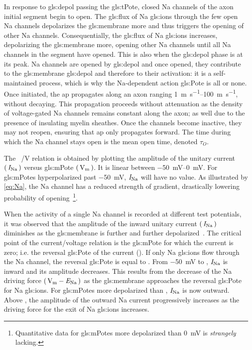 \documentclass[class={myRUCProject}, crop=false]{standalone}
\begin{document}
In response to \gls{gls:depol} passing the \gls{gls:tPote}, closed \gls{Na} channels of the axon initial segment begin to open. The \gls{gls:flux} of \gls{Na} \glspl{gls:ion} through the few open \gls{Na} channels depolarizes the \gls{gls:membrane} more and thus triggers the opening of other \gls{Na} channels. 
Consequentially, the \gls{gls:flux} of \gls{Na} \glspl{gls:ion} increases, depolarizing the \gls{gls:membrane} more, opening other \gls{Na} channels until all \gls{Na} channels in the segment have opened. This is also when the \gls{gls:depol} phase is at its peak. 
\gls{Na} channels are opened by \gls{gls:depol} and once opened, they contribute to the \gls{gls:membrane} \gls{gls:depol} and therefore to their activation: it is a self-maintained process, which is why the \gls{Na}-dependent action \gls{gls:Pote} is all or none. Once initiated, the \gls{ap} propagates along an axon ranging \qtyrange{1}{100}{\meter\per\s}, without decaying. 
This propagation proceeds without attenuation as the density of voltage-gated \gls{Na} channels remains constant along the axon; as well due to the presence of insulating myelin sheathes. 
Once the channels become inactive, they may not reopen, ensuring that \gls{ap} only propagates forward.
The time during which the \gls{Na} channel stays open is the mean open time, denoted \(\tau_O\). 

The \unit[per-mode = symbol]{\cur\sodium\per\V} relation is obtained by plotting the amplitude of the unitary current \(\br{\cur\sodium}\) versus \gls{gls:mPote} \(\br{\unit{\V\membrane}}\). It is linear between \qtyrange{-50}{0}{\mV}. For \glspl{gls:mPote} hyperpolarized past \qty{-50}{\mV}, \(\mathit{I}_\mathrm{Na}\) will have no value. As illustrated by \cref{eq:Na}, the \gls{Na} channel has a reduced strength of gradient, drastically lowering probability of opening~\footnote{
Quantitative data for \glspl{gls:mPote} more depolarized than \qty{0}{\mV} is \emph{strangely} lacking.}. 

When the activity of a single \gls{Na} channel is recorded at different test potentials, it was observed that the amplitude of the inward unitary current \(\br{\cur\sodium}\) diminishes as the \gls{gls:membrane} is further and further depolarized~\cite{Hammond2015ch4}. The critical point of the current/voltage relation is the \gls{gls:mPote} for which the current is zero; i.e. the reversal \gls{gls:Pote} of the current (\equilibria\reverse). If only \gls{Na} \glspl{gls:ion} flow through the \gls{Na} channel, the reversal \gls{gls:Pote} is equal to \equilibria\sodium. From \qty{-50}{\mV} to \equilibria\reverse, \(\mathit{I}_\mathrm{Na}\) is inward and its amplitude decreases. This results from the decrease of the \gls{Na} driving force \(\br{\unit{\V\membrane}-\equilibria\sodium}\) as the \gls{gls:membrane} approaches the reversal \gls{gls:Pote} for \gls{Na} \glspl{gls:ion}. For \glspl{gls:mPote} more depolarized than \equilibria\reverse, \(\mathit{I}_\mathrm{Na}\) is now outward. Above \equilibria\reverse, the amplitude of the outward \gls{Na} current progressively increases as the driving force for the exit of \gls{Na} \glspl{gls:ion} increases. 
\end{document}

